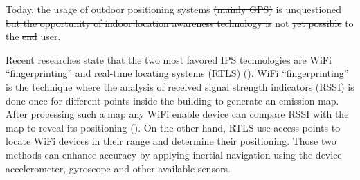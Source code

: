
Today, the usage of outdoor positioning systems \st{(mainly GPS)} is unquestioned  \st{but the opportunity of indoor location awareness technology is} not \st{yet possible}  to the \st{end}  user.






Recent researches state that the two most favored IPS technologies are WiFi ``fingerprinting'' and real-time locating systems (RTLS) (\href{http://www.idtechex.com/research/articles/the-rise-of-mobile-phone-indoor-positioning-systems-00005684.asp}{}). WiFi ``fingerprinting'' is the technique where the analysis of received signal strength indicators (RSSI) is done once for different points inside the building to generate an emission map. After processing such a map any WiFi enable device can compare RSSI with the map to reveal its positioning (\href{http://ieeexplore.ieee.org/xpl/login.jsp?tp=&arnumber=996891&url=http%3A%2F%2Fieeexplore.ieee.org%2Fxpls%2Fabs_all.jsp%3Farnumber%3D996891}{\todo{finish ref}}). On the other hand, RTLS use access points to locate WiFi devices in their range and determine their positioning. Those two methods can enhance accuracy by applying inertial navigation using the device accelerometer, gyroscope and other available sensors.

